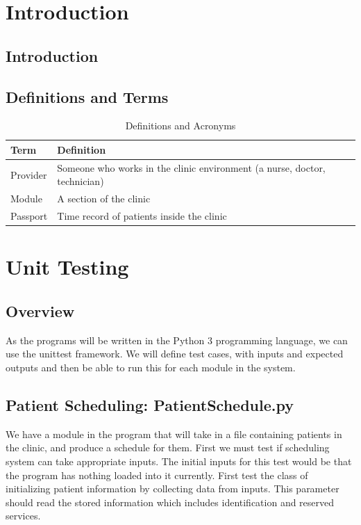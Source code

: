 \documentclass[12pt]{article}
\begin{document}
\section{Introduction}

\subsection{Introduction}

\subsection{Definitions and Terms} 
\begin{center}
\begin{longtable}{>{\raggedright\arraybackslash}p{}>{\raggedright\arraybackslash}p{}}
\caption{Definitions and Acronyms}\label{Table_Acronyms}\\
\toprule

\bf Term & \bf Definition\\\midrule
Provider & Someone who works in the clinic environment (a nurse, doctor, technician)\\\midrule
Module & A section of the clinic \\ \midrule
Passport & Time record of patients inside the clinic \\ 
\bottomrule
\end{longtable}
\end{center}

\section{Unit Testing}
\subsection{Overview}
	As the programs will be written in the Python 3 programming language, we can use the unittest framework. We will define test cases, with inputs and expected outputs and then be able to run this for each module in the system. 

\subsection{Patient Scheduling: PatientSchedule.py} 
	We have a module in the program that will take in a file containing patients in the clinic, and produce a schedule for them. First we must test if scheduling system can take appropriate inputs. The initial inputs for this test would be that the program has nothing loaded into it currently. First test the class of initializing patient information by collecting data from inputs. This parameter should read the stored information which includes identification and reserved services.
\end{document}
